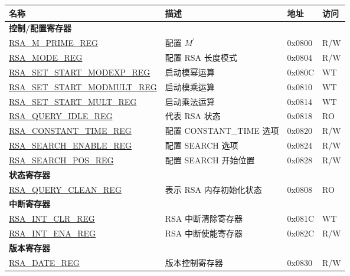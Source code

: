 \begin{longtable}{ | p{6cm} | p{7.2cm} | p{1.3cm} | p{1cm} | }
\hline\rowcolor{lightgray}
\textbf{名称} & \textbf{描述} &  \textbf{地址} & \textbf{访问} \\ \hline
\endhead
\multicolumn{4}{|l|}{\textbf{{控制/配置寄存器}}} \\ \hline
\hyperref[regdesc:RSAMPRIMEREG]{RSA\_M\_PRIME\_REG} & 配置 \begin{math}M^{\prime}\end{math} & 0x0800 & R/W \\ \hline
\hyperref[regdesc:RSAMODEREG]{RSA\_MODE\_REG} & 配置 RSA 长度模式 & 0x0804 & R/W \\ \hline
\hyperref[regdesc:RSASETSTARTMODEXPREG]{RSA\_SET\_START\_MODEXP\_REG} & 启动模幂运算 & 0x080C & WT \\ \hline
\hyperref[regdesc:RSASETSTARTMODMULTREG]{RSA\_SET\_START\_MODMULT\_REG} & 启动模乘运算 & 0x0810 & WT \\ \hline
\hyperref[regdesc:RSASETSTARTMULTREG]{RSA\_SET\_START\_MULT\_REG} & 启动乘法运算 & 0x0814 & WT \\ \hline
\hyperref[regdesc:RSAQUERYIDLEREG]{RSA\_QUERY\_IDLE\_REG} & 代表 RSA 状态 & 0x0818 & RO \\ \hline
\hyperref[regdesc:RSACONSTANTTIMEREG]{RSA\_CONSTANT\_TIME\_REG} & 配置 CONSTANT\_TIME 选项 & 0x0820 & R/W \\ \hline
\hyperref[regdesc:RSASEARCHENABLEREG]{RSA\_SEARCH\_ENABLE\_REG} & 配置 SEARCH 选项 & 0x0824 & R/W \\ \hline
\hyperref[regdesc:RSASEARCHPOSREG]{RSA\_SEARCH\_POS\_REG} & 配置 SEARCH 开始位置 & 0x0828 & R/W \\ \hline
\multicolumn{4}{|l|}{\textbf{状态寄存器}} \\ \hline
\hyperref[regdesc:RSAQUERYCLEANREG]{RSA\_QUERY\_CLEAN\_REG} & 表示 RSA 内存初始化状态 & 0x0808 & RO \\ \hline
\multicolumn{4}{|l|}{\textbf{中断寄存器}} \\ \hline
\hyperref[regdesc:RSAINTCLRREG]{RSA\_INT\_CLR\_REG} & RSA 中断清除寄存器 & 0x081C & WT \\ \hline
\hyperref[regdesc:RSAINTENAREG]{RSA\_INT\_ENA\_REG} & RSA 中断使能寄存器 & 0x082C & R/W \\ \hline
\multicolumn{4}{|l|}{\textbf{版本寄存器}} \\ \hline
\hyperref[regdesc:RSADATEREG]{RSA\_DATE\_REG} & 版本控制寄存器 & 0x0830 & R/W \\ \hline
\end{longtable}

